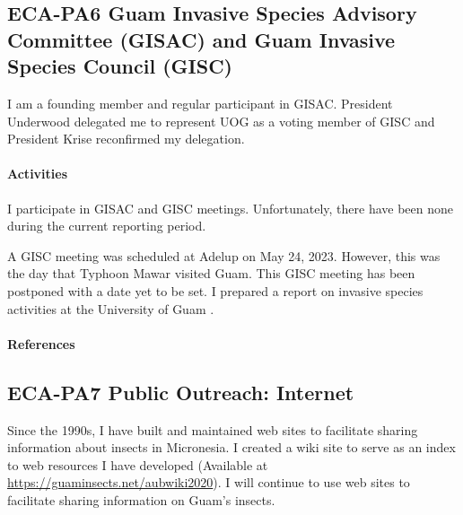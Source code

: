 \subsection{ECA-PA6 Guam Invasive Species Advisory Committee (GISAC) and Guam Invasive Species Council (GISC)}
\begin{refsection}
	
I am a founding member and regular participant in GISAC. President Underwood delegated me to represent UOG as a voting member of GISC and President Krise reconfirmed my delegation.

\paragraph{Activities}

I participate in GISAC and GISC meetings. Unfortunately, there have been none during the current reporting period.

A GISC meeting was scheduled at Adelup on May 24, 2023. However, this was the day that Typhoon Mawar visited Guam. This GISC meeting has been postponed with a date yet to be set. I prepared a report on invasive species activities at the University of Guam \cite{GISC2023}.

\paragraph{References}
\printbibliography[heading=none]
\end{refsection}	

\subsection{ECA-PA7 Public Outreach: Internet}

Since the 1990s, I have built and maintained web sites to facilitate sharing information about insects in Micronesia. I created a wiki site to serve as an index to web resources I have developed (Available at  \url{https://guaminsects.net/aubwiki2020}). I will continue to use web sites to facilitate sharing information on Guam's insects.

